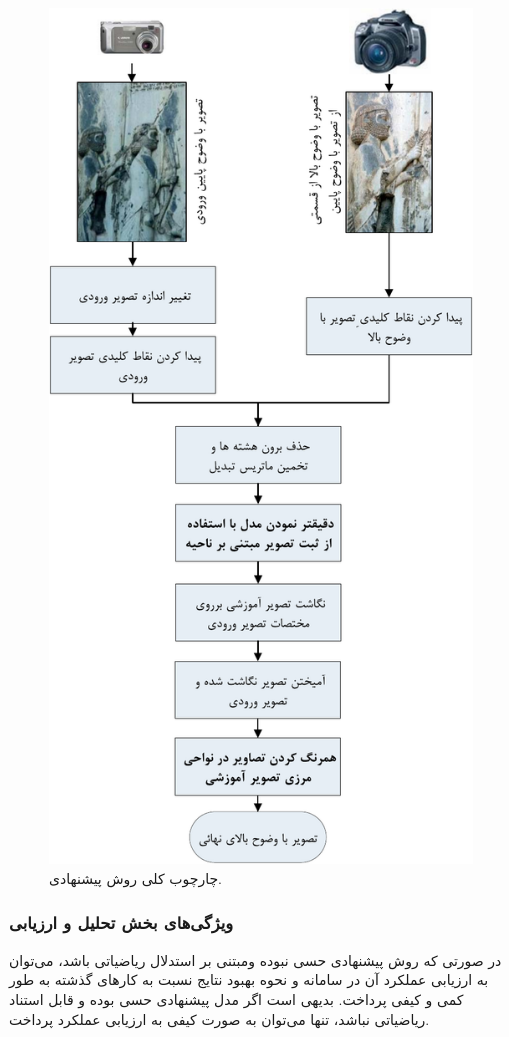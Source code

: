 \documentclass{CSICC2016}
\begin{document}
\begin{figure}[t]
\includegraphics[width=.9\linewidth]{Images/flowchar}
\caption{چارچوب کلی روش پیشنهادی.}
\label{fig:OneLRoneHR}
\end{figure}


\subsubsection{ویژگی‌های بخش تحلیل و ارزیابی}
در صورتی که روش پیشنهادی حسی نبوده ومبتنی بر استدلال ریاضیاتی باشد، می‌توان به ارزیابی عملکرد آن در سامانه و نحوه بهبود نتایج نسبت به کارهای گذشته به طور کمی و کیفی پرداخت. بدیهی است اگر مدل پیشنهادی حسی بوده و قابل استناد ریاضیاتی نباشد، تنها می‌توان به صورت کیفی به ارزیابی عملکرد پرداخت.
\end{document}
